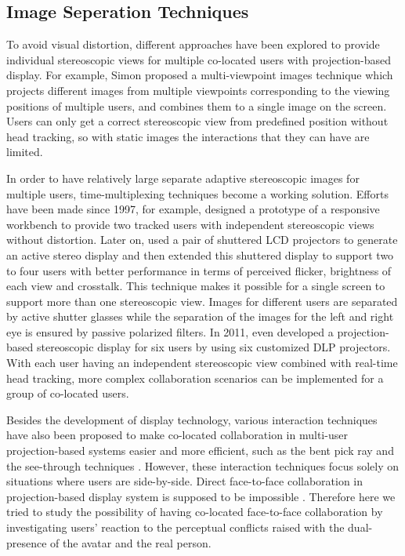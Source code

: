 \subsection{Image Seperation Techniques}
To avoid visual distortion, different approaches have been explored to provide individual stereoscopic views for multiple co-located users with projection-based display. For example, Simon proposed a multi-viewpoint images technique \citep{Simon2007MVI} which projects different images from multiple viewpoints corresponding to the viewing positions of multiple users, and combines them to a single image on the screen. Users can only get a correct stereoscopic view from predefined position without head tracking, so with static images the interactions that they can have are limited. 

In order to have relatively large separate adaptive stereoscopic images for multiple users, time-multiplexing techniques become a working solution. Efforts have been made since 1997, for example, \citet{Agrawala1997TRW} designed a prototype of a responsive workbench to provide two tracked users with independent stereoscopic views without distortion. Later on, \citet{Kunz2002TSC} used a pair of shuttered LCD projectors to generate an active stereo display and then \citet{Frohlich2005MultiViewer} extended this shuttered display to support two to four users with better performance in terms of perceived flicker, brightness of each view and crosstalk. This technique makes it possible for a single screen to support more than one stereoscopic view. Images for different users are separated by active shutter glasses while the separation of the images for the left and right eye is ensured by passive polarized filters. In 2011, \citet{Kulik2011CSS} even developed a projection-based stereoscopic display for six users by using six customized DLP projectors. With each user having an independent stereoscopic view combined with real-time head tracking, more complex collaboration scenarios can be implemented for a group of co-located users.

Besides the development of display technology, various interaction techniques have also been proposed to make co-located collaboration in multi-user projection-based systems easier and more efficient, such as the bent pick ray \citep{Riege2006Bent} and the see-through techniques \citep{Argelaguet2010STT}. However, these interaction techniques focus solely on situations where users are side-by-side. Direct face-to-face collaboration in projection-based display system is supposed to be impossible \citep{Salzmann2009CIC}. Therefore here we tried to study the possibility of having co-located face-to-face collaboration by investigating users' reaction to the perceptual conflicts raised with the dual-presence of the avatar and the real person.

